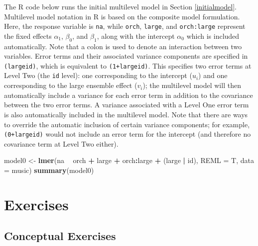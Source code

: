 \documentclass[
]{krantz}
\newenvironment{Shaded}{\begin{snugshade}}{\end{snugshade}}
\newcommand{\DataTypeTok}[1]{\textcolor[rgb]{0.27,0.27,0.27}{#1}}
\newcommand{\KeywordTok}[1]{\textcolor[rgb]{0.27,0.27,0.27}{\textbf{#1}}}
\newcommand{\NormalTok}[1]{#1}
\newcommand{\OperatorTok}[1]{\textcolor[rgb]{0.43,0.43,0.43}{\textbf{#1}}}
\newcommand{\StringTok}[1]{\textcolor[rgb]{0.5,0.5,0.5}{#1}}
\begin{document}
The R code below runs the initial multilevel model  in Section \ref{initialmodel}. Multilevel model notation in R is based on the composite model formulation. Here, the response variable is \texttt{na}, while \texttt{orch}, \texttt{large}, and \texttt{orch:large} represent the fixed effects \(\alpha_{1}\), \(\beta_{0}\), and \(\beta_{1}\), along with the intercept \(\alpha_{0}\) which is included automatically. Note that a colon is used to denote an interaction between two variables. Error terms and their associated variance components are specified in \texttt{(large\textbar{}id)}, which is equivalent to \texttt{(1+large\textbar{}id)}. This specifies two error terms at Level Two (the \texttt{id} level): one corresponding to the intercept (\(u_{i}\)) and one corresponding to the large ensemble effect (\(v_{i}\)); the multilevel model will then automatically include a variance for each error term in addition to the covariance between the two error terms. A variance associated with a Level One error term is also automatically included in the multilevel model. Note that there are ways to override the automatic inclusion of certain variance components; for example, \texttt{(0+large\textbar{}id)} would not include an error term for the intercept (and therefore no covariance term at Level Two either).

\begin{Shaded}
\begin{Highlighting}[]
\NormalTok{model0 <-}\StringTok{ }\KeywordTok{lmer}\NormalTok{(na }\OperatorTok{~}\StringTok{ }\NormalTok{orch }\OperatorTok{+}\StringTok{ }\NormalTok{large }\OperatorTok{+}\StringTok{ }\NormalTok{orch}\OperatorTok{:}\NormalTok{large }\OperatorTok{+}
\StringTok{  }\NormalTok{(large }\OperatorTok{|}\StringTok{ }\NormalTok{id), }\DataTypeTok{REML =}\NormalTok{ T, }\DataTypeTok{data =}\NormalTok{ music)}
\KeywordTok{summary}\NormalTok{(model0)}
\end{Highlighting}
\end{Shaded}

\hypertarget{exercises-7}{%
\section{Exercises}\label{exercises-7}}

\hypertarget{conceptual-exercises-5}{%
\subsection{Conceptual Exercises}\label{conceptual-exercises-5}}
\end{document}
